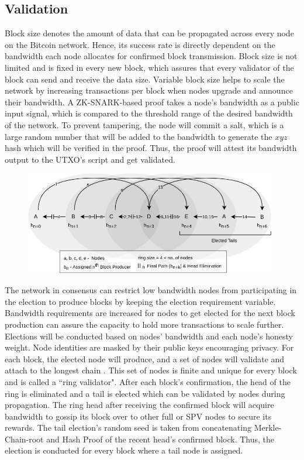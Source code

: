 \documentclass[a4paper, 10pt]{extarticle}
\begin{document}
\subsection{Validation}
Block size denotes the amount of data that can be propagated across every node on the Bitcoin network. Hence, its success rate is directly dependent on the bandwidth each node allocates for confirmed block transmission. Block size is not limited and is fixed in every new block, which assures that every validator of the block can send and receive the data size. Variable block size helps to scale the network by increasing transactions per block when nodes upgrade and announce their bandwidth. A ZK-SNARK-based proof takes a node’s bandwidth as a public input signal, which is compared to the threshold range of the desired bandwidth of the network. To prevent tampering, the node will commit a salt, which is a large random number that will be added to the bandwidth to generate the $xyz$ hash which will be verified in the proof. Thus, the proof will attest its bandwidth output to the UTXO’s script and get validated.\\
\begin{figure}[H]
\begin{center}
\includegraphics[width=11cm]{ring}
\end{center}
\end{figure}
The network in consensus can restrict low bandwidth nodes from participating in the election to produce blocks by keeping the election requirement variable. Bandwidth requirements are increased for nodes to get elected for the next block production can assure the capacity to hold more transactions to scale further. Elections will be conducted based on nodes' bandwidth and each node's honesty weight. Node identities are masked by their public keys encouraging privacy. For each block, the elected node will produce, and a set of nodes will validate and attach to the longest chain \cite{nakamoto2008bitcoin}. This set of nodes is finite and unique for every block and is called a ``ring validator". After each block's confirmation, the head of the ring is eliminated and a tail is elected which can be validated by nodes during propagation. The ring head after receiving the confirmed block will acquire bandwidth to gossip its block over to other full or SPV nodes to secure its rewards. The tail election's random seed is taken from concatenating Merkle-Chain-root and Hash Proof \cite{yakovenko2018solana} of the recent head's confirmed block. Thus, the election is conducted for every block where a tail node is assigned.
\end{document}
